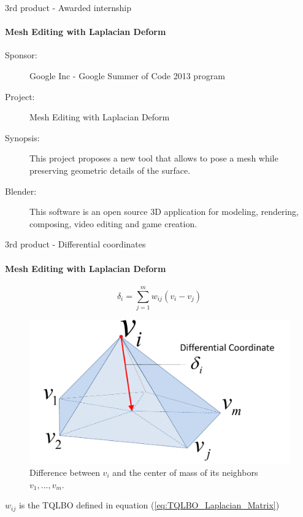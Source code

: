 \documentclass[10pt, compress, english]{beamer}
\begin{document}
\begin{frame}{3rd product - Awarded internship}


\framesubtitle{Mesh Editing with Laplacian Deform}
\begin{description}
\item [{Sponsor:}] Google Inc - Google Summer of Code 2013 program
\item [{Project:}] Mesh Editing with Laplacian Deform
\item [{Synopsis:}] This project proposes a new tool that allows to pose
a mesh while preserving geometric details of the surface.
\item [{Blender:}] This software is an open source 3D application for modeling,
rendering, composing, video editing and game creation.
\end{description}
\end{frame}

 
\begin{frame}{3rd product - Differential coordinates}


\framesubtitle{Mesh Editing with Laplacian Deform}


\begin{equation}
\delta_{i}=\overset{m}{\underset{j=1}{\sum}}w_{ij}\left(v_{i}-v_{j}\right)\label{eq:DifferentialCoordinate}
\end{equation}



\begin{figure}[H]
\noindent \begin{centering}
\includegraphics[width=0.4\columnwidth]{img/DifferentialCoordinates}
\par\end{centering}

\protect\caption{Difference between $v_{i}$ and the center of mass of its neighbors
$v_{1},...,v_{m}$.}
\end{figure}



$w_{ij}$ is the TQLBO defined in equation (\ref{eq:TQLBO_Laplacian_Matrix})

\end{frame}
\end{document}
